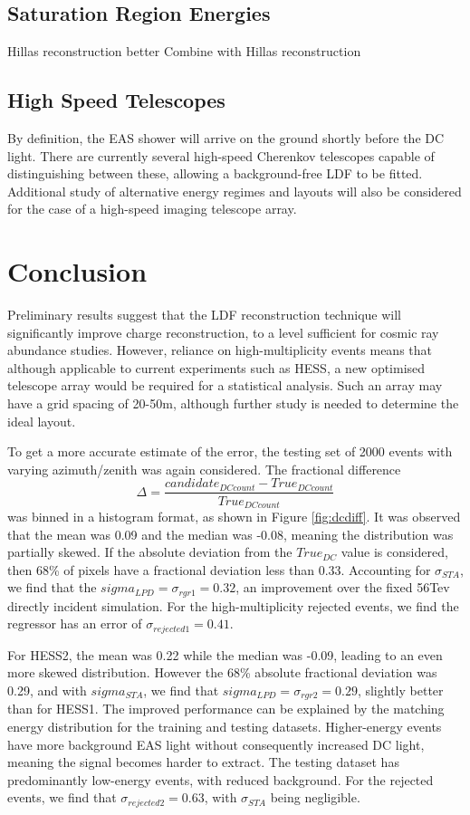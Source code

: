 \documentclass{article}
\begin{document}
\subsection{Saturation Region Energies}
Hillas reconstruction better
Combine with Hillas reconstruction

\subsection{High Speed Telescopes}
By definition, the EAS shower will arrive on the ground shortly before the DC light. There are currently several high-speed Cherenkov telescopes capable of distinguishing between these, allowing a background-free LDF to be fitted. Additional study of alternative energy regimes and layouts will also be considered for the case of a high-speed imaging telescope array. 

\section{Conclusion}
Preliminary results suggest that the LDF reconstruction technique will significantly improve charge reconstruction, to a level sufficient for cosmic ray abundance studies. However, reliance on high-multiplicity events means that although applicable to current experiments such as HESS, a new optimised telescope array would be required for a statistical analysis. Such an array may have a grid spacing of 20-50m, although further study is needed to determine the ideal layout.

To get a more accurate estimate of the error, the testing set of 2000 events with varying azimuth/zenith was again considered. The fractional difference \[  \Delta = \frac{ candidate_{DC count} - True_{DC count}}{True_{DC count}} \] was binned in a histogram format, as shown in Figure \ref{fig:dcdiff}. It was observed that the mean was 0.09 and the median was -0.08, meaning the distribution was partially skewed. If the absolute deviation from the $True_{DC}$ value is considered, then 68\% of pixels have a fractional deviation less than 0.33. Accounting for $\sigma_{STA}$, we find that the $sigma_{LPD}=\sigma_{rgr1}=0.32$, an improvement over the fixed 56Tev directly incident simulation. For the high-multiplicity rejected events, we find the regressor has an error of $\sigma_{rejected1}=0.41$.

For HESS2, the mean was 0.22 while the median was -0.09, leading to an even more skewed distribution. However the 68\% absolute fractional deviation was 0.29, and with $sigma_{STA}$, we find that $sigma_{LPD}=\sigma_{rgr2}=0.29$, slightly better than for HESS1. The improved performance can be explained by the matching energy distribution for the training and testing datasets. Higher-energy events have more background EAS light without consequently increased DC light, meaning the signal becomes harder to extract. The testing dataset has predominantly low-energy events, with reduced background. For the rejected events, we find that $\sigma_{rejected2}=0.63$, with $\sigma_{STA}$ being negligible.
\end{document}

